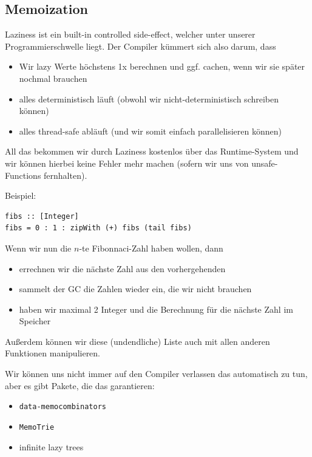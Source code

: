 \documentclass{beamer}
\begin{document}
\subsection{Memoization}

\begin{frame}
Laziness ist ein \glqq built-in controlled side-effect\grqq , welcher unter unserer Programmierschwelle liegt. Der Compiler kümmert sich also darum, dass\pause
\begin{itemize}
 \item Wir lazy Werte höchstens 1x berechnen und ggf. cachen, wenn wir sie später nochmal brauchen
 \item alles deterministisch läuft (obwohl wir nicht-deterministisch schreiben können)
 \item alles thread-safe abläuft (und wir somit einfach parallelisieren können)
\end{itemize}
\pause
All das bekommen wir durch Laziness kostenlos über das Runtime-System und wir können hierbei keine Fehler mehr machen (sofern wir uns von unsafe-Functions fernhalten).
\end{frame}

\begin{frame}[fragile]
Beispiel:
\begin{verbatim}
fibs :: [Integer]
fibs = 0 : 1 : zipWith (+) fibs (tail fibs)
\end{verbatim}
\pause
Wenn wir nun die $n$-te Fibonnaci-Zahl haben wollen, dann
\begin{itemize}
 \item errechnen wir die nächste Zahl aus den vorhergehenden
 \pause
 \item sammelt der GC die Zahlen wieder ein, die wir nicht brauchen
 \pause
 \item haben wir maximal 2 Integer und die Berechnung für die nächste Zahl im Speicher
\end{itemize}
\pause
Außerdem können wir diese (undendliche) Liste auch mit allen anderen Funktionen manipulieren.
\end{frame}

\begin{frame}[fragile]
Wir können uns nicht immer auf den Compiler verlassen das automatisch zu tun, aber es gibt Pakete, die das garantieren:
\begin{itemize}
 \item \texttt{data-memocombinators}
 \item \texttt{MemoTrie}
 \item infinite lazy trees
\end{itemize}

\end{frame}
\end{document}
